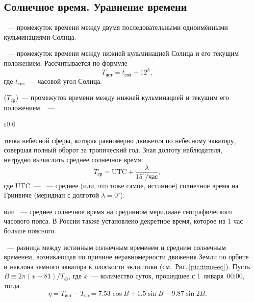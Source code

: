 \subsection{Солнечное время. Уравнение времени}
~--- промежуток времени между двумя последовательными одноимёнными кульминациями Солнца.

~--- промежуток времени между нижней кульминацией Солнца и его текущим положением. Рассчитывается по формуле
\begin{equation}
	T_{\text{ист}} = t_{\text{сол}}+12^h,
\end{equation}
где $t_{\text{сол}}$~--- часовой угол Солнца.

 ($T_\text{ср}$)~--- промежуток времени между нижней
кульминацией  и текущим его положением. ~---
\begin{wrapfigure}[14]{r}{0.6\tw}
	\centering
	\vspace{-1pc}
	\caption{График уравнения времени}
	\label{pic:time-eq}
\end{wrapfigure}
точка небесной сферы, которая равномерно движется по небесному экватору, совершая полный оборот за тропический год. Зная долготу наблюдателя, нетрудно вычислить среднее солнечное время:
\begin{equation*}
	T_\text{ср} = \text{UTC} + \frac{\lambda}{15^\circ/\text{час}},
\end{equation*}
где UTC~--- ~--- среднее (или, что тоже самое, истинное) солнечное время на Гринвиче (меридиан с долготой $\lambda = 0^\circ$).

 или ~--- среднее солнечное время на срединном меридиане географического часового пояса. В России также установлено декретное время, которое на 1 час больше поясного.

~--- разница между истинным солнечным временем и средним солнечным временем, возникающая по причине неравномерности движения Земли по орбите и наклона земного экватора к плоскости эклиптики (см.~Рис.\,\ref{pic:time-eq}). Пусть $B \equiv 2 \pi (x - 81)/T_\oplus$, где $x$~--- количество суток, прошедшее с 1~января~00:00, тогда
\begin{equation}
	\eta = T_{\text{ист}} - T_\text{ср} = 7.53 \cos B + 1.5 \sin B - 9.87 \sin 2 B.
\end{equation}
